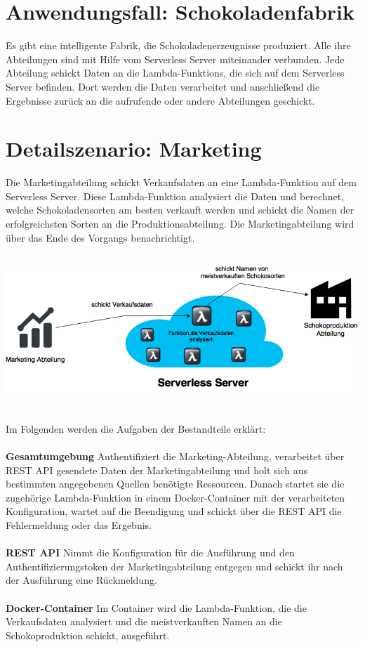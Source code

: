 \documentclass[a4paper,20pt,oneside]{book}
\begin{document}
\pagebreak

\section{Anwendungsfall: Schokoladenfabrik}
Es gibt eine intelligente Fabrik, die Schokoladenerzeugnisse produziert. Alle ihre Abteilungen sind mit Hilfe vom \gls{Serverless} Server miteinander verbunden. Jede Abteilung schickt Daten an die \glspl{Lambda-Funktion}, die sich auf dem Serverless Server befinden. Dort werden die Daten verarbeitet und anschließend die Ergebnisse zurück an die aufrufende oder andere Abteilungen geschickt. 

\section{Detailszenario: Marketing}
Die Marketingabteilung schickt Verkaufsdaten an eine \gls{Lambda-Funktion} auf dem \gls{Serverless} Server. Diese \gls{Lambda-Funktion} analysiert die Daten und berechnet, welche Schokoladensorten am besten verkauft werden und schickt die Namen der erfolgreichsten Sorten an die Produktionsabteilung. Die Marketingabteilung wird über das Ende des Vorgangs benachrichtigt.
\\
\begin{center}
\includegraphics[width=\linewidth,height=220px ]{marketing.png}
\end{center} 
Im Folgenden werden die Aufgaben der Bestandteile erklärt:
\\ \\
\textbf{Gesamtumgebung} Authentifiziert die Marketing-Abteilung, verarbeitet über REST API gesendete Daten der Marketingabteilung und holt sich aus bestimmten angegebenen Quellen benötigte Ressourcen. Danach startet sie die zugehörige \gls{Lambda-Funktion} in einem \Gls{Docker}-\Gls{Container} mit der verarbeiteten Konfiguration, wartet auf die Beendigung und schickt über die REST API die Fehlermeldung oder das Ergebnis.
\\ \\
\textbf{REST API} Nimmt die Konfiguration für die Ausführung und den Authentifizierungstoken der Marketingabteilung entgegen und schickt ihr nach der Ausführung eine Rückmeldung.
\\ \\
\textbf{\Gls{Docker}-\Gls{Container}} Im \Gls{Container} wird die \gls{Lambda-Funktion}, die die Verkaufsdaten analysiert und die meistverkauften Namen an die Schokoproduktion schickt, ausgeführt.
\\
\end{document}
